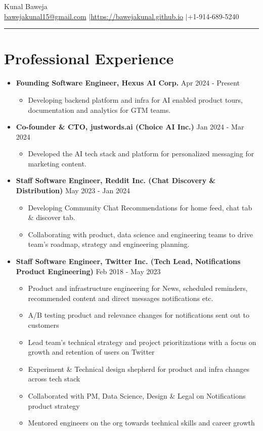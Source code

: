 \documentclass{article}
\def\name{Kunal Baweja}
\newcommand{\bi}{\vspace{-1mm}\begin{itemize}[align=left,leftmargin=*, rightmargin=80pt, labelindent=0pt,labelsep=2pt, label={-}, nosep]}
\newcommand{\ei}{\end{itemize}}
\begin{document}
\begin{center}
{\huge \name}\\
\href{mailto:bawejakunal15@gmail.com}{bawejakunal15@gmail.com} $|$\hspace{3pt}\href{https://bawejakunal.github.io}{https://bawejakunal.github.io} $|$\hspace{3pt}+1-914-689-5240
\end{center}

\hrule
\vspace{5pt}

\vspace{-1mm}
\section*{Professional Experience}
\begin{itemize}
    \item \textbf{Founding Software Engineer, Hexus AI Corp.} {\hfill Apr 2024 - Present}
    \bi
        \item Developing backend platform and infra for AI enabled product tours, documentation and analytics for GTM teams.
    \ei

    \item \textbf{Co-founder \& CTO, justwords.ai (Choice AI Inc.)} {\hfill Jan 2024 - Mar 2024}
    \bi
        \item Developed the AI tech stack and platform for personalized messaging for marketing content.
    \ei
    
    \item \textbf{Staff Software Engineer, Reddit Inc. (Chat Discovery \& Distribution)} {\hfill May 2023 - Jan 2024}
    \bi
        \item Developing Community Chat Recommendations for home feed, chat tab \& discover tab.
        \item Collaborating with product, data science and engineering teams to drive team's roadmap, strategy and engineering planning.
    \ei
    
    \item \textbf{Staff Software Engineer, Twitter Inc. (Tech Lead, Notifications Product Engineering)} {\hfill Feb 2018 - May 2023}
    \bi
      \item Product and infrastructure engineering for News, scheduled reminders, recommended content and direct messages notifications etc.
      \item A/B testing product and relevance changes for notifications sent out to customers
      \item Lead team's technical strategy and project prioritizations with a focus on growth and retention of users on Twitter
      \item Experiment \& Technical design shepherd for product and infra changes across tech stack
      \item Collaborated with PM, Data Science, Design \& Legal on Notifications product strategy
      \item Mentored engineers on the org towards technical skills and career growth
    \ei


\end{itemize}
\end{document}
